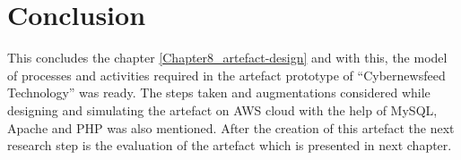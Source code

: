 \section{Conclusion}
This concludes the chapter \ref{Chapter8_artefact-design} and with this,  the model of processes and activities required in the artefact prototype of \enquote{Cybernewsfeed Technology} was ready.
The steps taken and augmentations considered while designing and simulating the artefact on AWS cloud with the help of MySQL, Apache and PHP was also mentioned.
After the creation of this artefact the next research step is the evaluation of the artefact which is presented in next chapter.






